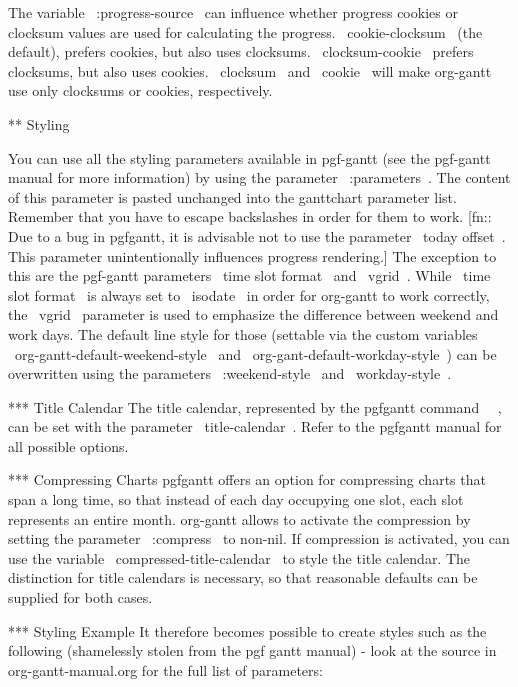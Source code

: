 The variable ~:progress-source~ can influence whether progress cookies or clocksum values are used for calculating the progress. ~cookie-clocksum~ (the default), prefers cookies, but also uses clocksums. ~clocksum-cookie~ prefers clocksums, but also uses cookies. ~clocksum~ and ~cookie~ will make org-gantt use only clocksums or cookies, respectively.

** Styling

You can use all the styling parameters available in pgf-gantt (see the pgf-gantt manual for more information) by using the parameter ~:parameters~. The content of this parameter is pasted unchanged into the ganttchart parameter list. Remember that you have to escape backslashes in order for them to work. [fn:: Due to a bug in pgfgantt, it is advisable not to use the parameter ~today offset~. This parameter unintentionally influences progress rendering.]
The exception to this are the pgf-gantt parameters ~time slot format~ and ~vgrid~. While ~time slot format~ is always set to ~isodate~ in order for org-gantt to work correctly, the ~vgrid~ parameter is used to emphasize the difference between weekend and work days. The default line style for those (settable via the custom variables ~org-gantt-default-weekend-style~ and ~org-gant-default-workday-style~) can be overwritten using the parameters ~:weekend-style~ and ~workday-style~. 

*** Title Calendar
The title calendar, represented by the pgfgantt command ~\pgftitlecalendar~, can be set with the parameter ~title-calendar~. Refer to the pgfgantt manual for all possible options.

*** Compressing Charts
pgfgantt offers an option for compressing charts that span a long time, so that instead of each day occupying one slot, each slot represents an entire month. org-gantt allows to activate the compression by setting the parameter ~:compress~ to non-nil. If compression is activated, you can use the variable ~compressed-title-calendar~ to style the title calendar. The distinction for title calendars is necessary, so that reasonable defaults can be supplied for both cases.

*** Styling Example
It therefore becomes possible to create styles such as the following (shamelessly stolen from the pgf gantt manual) - look at the source in org-gantt-manual.org for the full list of parameters:

